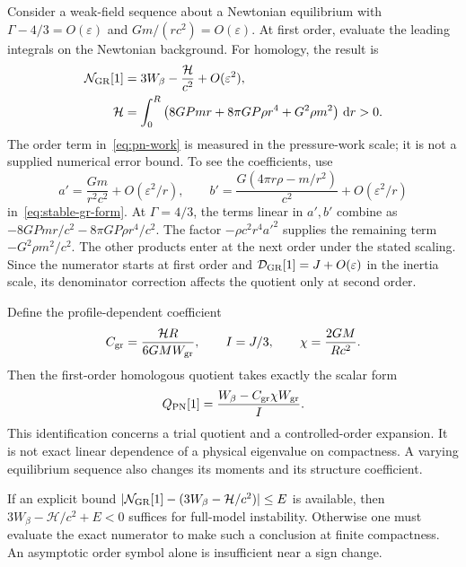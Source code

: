 \documentclass[11pt,letterpaper]{article}
\newcommand{\dd}{\,\mathrm d}
\theoremstyle{definition}
\numberwithin{equation}{section}
\begin{document}
Consider a weak-field sequence about a Newtonian equilibrium with
$\Gamma-4/3=O(\varepsilon)$ and $Gm/(rc^2)=O(\varepsilon)$. At first
order, evaluate the leading integrals on the Newtonian background. For
homology, the result is
\begin{align}
 \mathcal N_{\rm GR}[1]&=3W_\beta-\frac{\mathcal H}{c^2}
                       +O(\varepsilon^2),\label{eq:pn-work}\\
 \mathcal H&=\int_0^R
   \left(8GPmr+8\pi GP\rho r^4+G^2\rho m^2\right)\dd r>0.
 \label{eq:structure-integral}
\end{align}
The order term in~\eqref{eq:pn-work} is measured in the pressure-work
scale; it is not a supplied numerical error bound. To see the coefficients,
use
\[
 a'=\frac{Gm}{r^2c^2}+O(\varepsilon^2/r),\qquad
 b'=\frac{G(4\pi r\rho-m/r^2)}{c^2}+O(\varepsilon^2/r)
\]
in~\eqref{eq:stable-gr-form}. At $\Gamma=4/3$, the terms linear in
$a',b'$ combine as $-8GPmr/c^2-8\pi GP\rho r^4/c^2$. The factor
$-\rho c^2r^4a'^2$ supplies the remaining term
$-G^2\rho m^2/c^2$. The other products enter at the next order under the
stated scaling. Since the numerator starts at first order and
$\mathcal D_{\rm GR}[1]=J+O(\varepsilon)$ in the inertia scale, its
denominator correction affects the quotient only at second order.

Define the profile-dependent coefficient
\begin{equation}
 C_{\rm gr}=\frac{\mathcal H R}{6GM W_{\rm gr}},\qquad I=J/3,
 \qquad \chi=\frac{2GM}{Rc^2}.
 \label{eq:cgr}
\end{equation}
Then the first-order homologous quotient takes exactly the scalar form
\begin{equation}
 Q_{\rm PN}[1]=\frac{W_\beta-C_{\rm gr}\chi W_{\rm gr}}{I}.
 \label{eq:pn-scalar}
\end{equation}
This identification concerns a trial quotient and a controlled-order
expansion. It is not exact linear dependence of a physical eigenvalue on
compactness. A varying equilibrium sequence also changes its moments and
its structure coefficient.

If an explicit bound
$|\mathcal N_{\rm GR}[1]-(3W_\beta-\mathcal H/c^2)|\le E$ is available,
then $3W_\beta-\mathcal H/c^2+E<0$ suffices for full-model instability.
Otherwise one must evaluate the exact numerator to make such a conclusion
at finite compactness. An asymptotic order symbol alone is insufficient
near a sign change.
\end{document}
